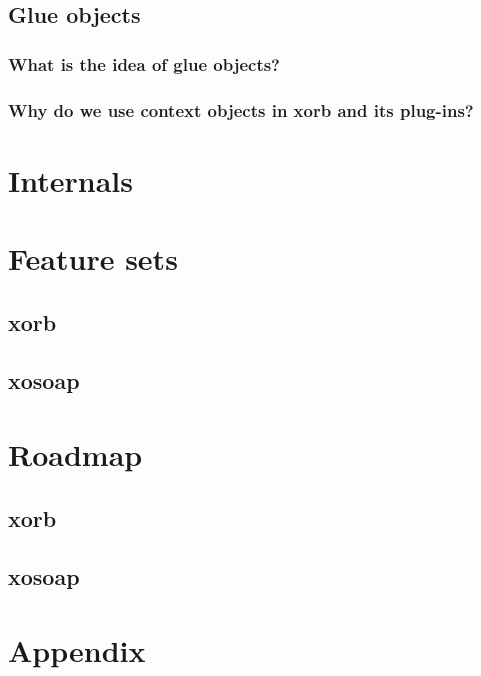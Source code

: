   \subsection{Glue objects}\label{sec:advanced:xorb:gobjects}
  \subsubsection{What is the idea of glue objects?}\label{sec:advanced:xorb:gobjects:what}
  \subsubsection{Why do we use context objects in xorb and its plug-ins?}\label{sec:advanced:xorb:gobjects:why}
  \section{Internals}\label{sec:internal}
  \section{Feature sets}
  \subsection{xorb}
  \subsection{xosoap}
  \section{Roadmap}
   \subsection{xorb}	
  \subsection{xosoap}
  \section{Appendix} 
